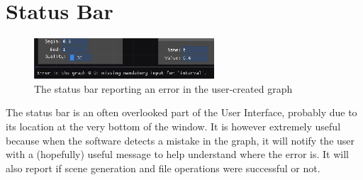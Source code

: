 \section{Status Bar}

\begin{figure}[H]
\centering
\includegraphics[width=0.6\textwidth]{figures/status_bar.png}
\caption{\label{fig:status_bar} The status bar reporting an error in the user-created graph}
\end{figure}

The status bar is an often overlooked part of the User Interface, probably due to its location
at the very bottom of the window. It is however extremely useful
because when the software detects a mistake in the graph, it will notify the user
with a (hopefully) useful message to help understand where the error is.
It will also report if scene generation and file operations were successful or not.


